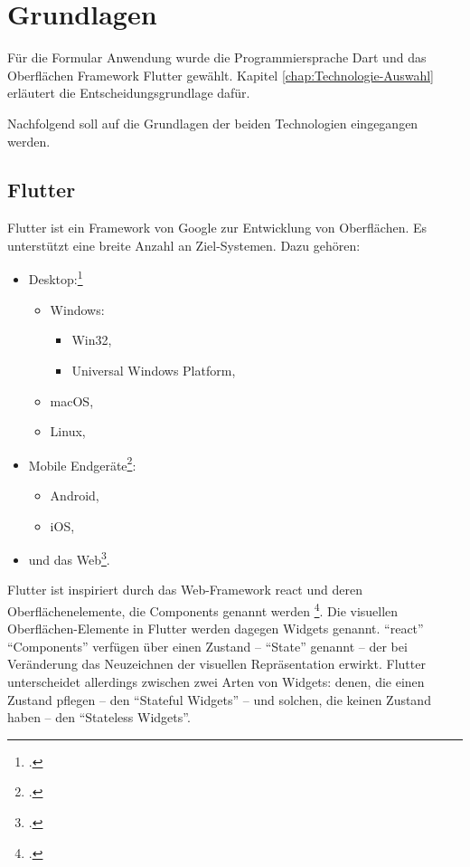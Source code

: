 \chapter{Grundlagen}
\label{chap:Grundlagen}

Für die Formular Anwendung wurde die Programmiersprache Dart und das Oberflächen Framework Flutter gewählt.
Kapitel \ref{chap:Technologie-Auswahl} erläutert die Entscheidungsgrundlage dafür.

Nachfolgend soll auf die Grundlagen der beiden Technologien eingegangen werden.

\section{Flutter}
\label{sec:Flutter-Grundlagen}

Flutter ist ein Framework von Google zur Entwicklung von Oberflächen.
Es unterstützt eine breite Anzahl an Ziel-Systemen.
 Dazu gehören:

\begin{itemize}[topsep=0pt,itemsep=-1ex,partopsep=1ex,parsep=1ex]
  \item Desktop:\footcite[Vgl.][]{DesktopSupportForFlutter}
        \begin{itemize}
          \item Windows:
                \begin{itemize}
                  \item Win32,
                  \item Universal Windows Platform,
                \end{itemize}
          \item macOS,
          \item Linux,
        \end{itemize}
  \item Mobile Endgeräte\footcite[Vgl.][]{FlutterBeautifulNativeAppsInRecordTime}:
        \begin{itemize}
          \item Android,
          \item iOS,
        \end{itemize}
  \item und das Web\footcite[Vgl.][]{WebSupportForFlutter}.
\end{itemize}

Flutter ist inspiriert durch das Web-Framework react und deren Oberflächenelemente, die Components genannt werden \footcite[Vgl.][]{IntroductionToWidgets}.
Die visuellen Oberflächen-Elemente in Flutter werden dagegen Widgets genannt.
\enquote{react} \enquote{Components} verfügen über einen Zustand -- \enquote{State} genannt -- der bei Veränderung das Neuzeichnen der visuellen Repräsentation erwirkt.
Flutter unterscheidet allerdings zwischen zwei Arten von Widgets: denen, die einen Zustand pflegen – den \enquote{Stateful Widgets} – und solchen, die keinen Zustand haben – den \enquote{Stateless Widgets}.

